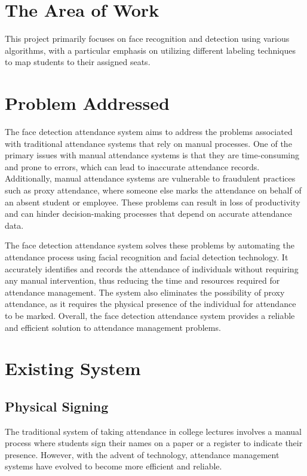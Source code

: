 \section{The Area of Work}This project primarily focuses on face recognition and detection using various algorithms, with a particular emphasis on utilizing different labeling techniques to map students to their assigned seats.


\section{Problem Addressed}
The face detection attendance system aims to address the problems associated with traditional attendance systems that rely on manual processes. One of the primary issues with manual attendance systems is that they are time-consuming and prone to errors, which can lead to inaccurate attendance records. Additionally, manual attendance systems are vulnerable to fraudulent practices such as proxy attendance, where someone else marks the attendance on behalf of an absent student or employee. These problems can result in loss of productivity and can hinder decision-making processes that depend on accurate attendance data.

The face detection attendance system solves these problems by automating the attendance process using facial recognition and facial detection technology. It accurately identifies and records the attendance of individuals without requiring any manual intervention, thus reducing the time and resources required for attendance management. The system also eliminates the possibility of proxy attendance, as it requires the physical presence of the individual for attendance to be marked. Overall, the face detection attendance system provides a reliable and efficient solution to attendance management problems.
\section{Existing System}

\subsection{Physical Signing}
The traditional system of taking attendance in college lectures involves a manual process where students sign their names on a paper or a register to indicate their presence. However, with the advent of technology, attendance management systems have evolved to become more efficient and reliable.

